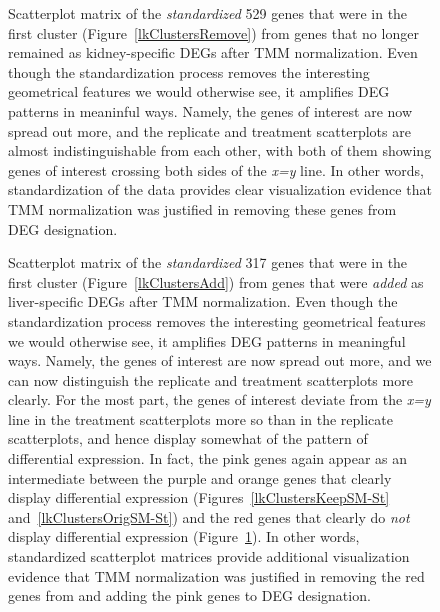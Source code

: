 \documentclass{bmcart}
\begin{document}
\begin{linenumbers}
\begin{backmatter}
\begin{figure}[h!]
\caption{
Scatterplot matrix of the \textit{standardized} 529 genes that were in the first cluster (Figure~\ref{lkClustersRemove}) from genes that no longer remained as kidney-specific DEGs after TMM normalization. Even though the standardization process removes the interesting geometrical features we would otherwise see, it amplifies DEG patterns in meaninful ways. Namely, the genes of interest are now spread out more, and the replicate and treatment scatterplots are almost indistinguishable from each other, with both of them showing genes of interest crossing both sides of the \textit{x=y} line. In other words, standardization of the data provides clear visualization evidence that TMM normalization was justified in removing these genes from DEG designation. 
\label{lkClustersRemoveSM-St}}
\end{figure}

\begin{figure}[h!]
\caption{
Scatterplot matrix of the \textit{standardized} 317 genes that were in the first cluster (Figure~\ref{lkClustersAdd}) from genes that were \textit{added} as liver-specific DEGs after TMM normalization. Even though the standardization process removes the interesting geometrical features we would otherwise see, it amplifies DEG patterns in meaningful ways. Namely, the genes of interest are now spread out more, and we can now distinguish the replicate and treatment scatterplots more clearly. For the most part, the genes of interest deviate from the \textit{x=y} line in the treatment scatterplots more so than in the replicate scatterplots, and hence display somewhat of the pattern of differential expression. In fact, the pink genes again appear as an intermediate between the purple and orange genes that clearly display differential expression (Figures~\ref{lkClustersKeepSM-St} and~\ref{lkClustersOrigSM-St}) and the red genes that clearly do \textit{not} display differential expression (Figure~\ref{lkClustersRemoveSM-St}). In other words, standardized scatterplot matrices provide additional visualization evidence that TMM normalization was justified in removing the red genes from and adding the pink genes to DEG designation.
\label{lkClustersAddSM-St}}
\end{figure}


\end{backmatter}
\end{linenumbers}
\end{document}
